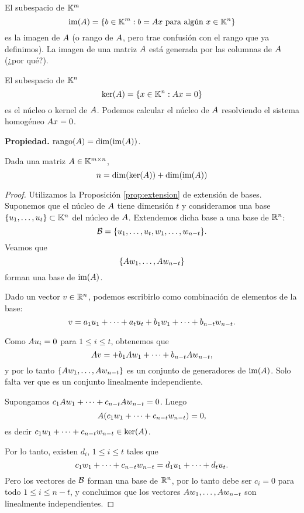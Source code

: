 \begin{definicion}
El subespacio de $\mathbb K^m$
$$
\im(A) =\{\bb \in \K^m : \bb = \Ab \xb \text{ para algún } \xb \in \K^n\}
$$
es la imagen de $\Ab$ (o rango de $\Ab$, pero trae confusión con el rango que ya definimos). La imagen de una matriz $\Ab$ está generada por las columnas de $\Ab$ (¿por qué?).

El subespacio de $\mathbb K^n$
$$
\ker(\Ab)=\{\xb \in \K^n: \Ab\xb = \cero\}
$$
es el núcleo o kernel de $\Ab$. Podemos calcular el núcleo de $\Ab$ resolviendo el sistema homogéneo $\Ab\xb = \cero$.
\end{definicion}



\textbf{Propiedad.} $\rank(\Ab) = \dim(\im(\Ab))$.

\begin{teorema} Dada una matriz $\Ab \in \K^{m \times n}$,
$$
n = \dim(\ker(\Ab)) + \dim(\im(\Ab))
$$
\end{teorema}

\begin{proof}
Utilizamos la Proposición \ref{prop:extension} de extensión de bases. Suponemos que el núcleo de $\Ab$ tiene dimensión $t$ y consideramos una base $\{\ub_1, \dots, \ub_t\} \subset \K^n$ del núcleo de $\Ab$. Extendemos dicha base a una base de $\mathbb R^n$:
$$
\B = \{\ub_1, \dots, \ub_t, \wb_1, \dots, \wb_{n-t}\}.
$$
Veamos que
$$
\{\Ab \wb_1, \dots, \Ab \wb_{n-t}\}
$$
forman una base de $\operatorname{im}(A)$.

Dado un vector $v \in \mathbb R^n$, podemos escribirlo como combinación de elementos de la base:
$$
v = a_1 \ub_1 + \dots +a_t \ub_t  + b_1 \wb_1 + \dots + b_{n-t} \wb_{n-t}.
$$

Como $\Ab \ub_i = \cero$ para $1 \le i \le t$, obtenemos que
$$
\Ab\vb = + b_1 \Ab \wb_1 + \dots + b_{n-t} \Ab\wb_{n-t},
$$
y por lo tanto $\{\Ab \wb_1, \dots, \Ab \wb_{n-t}\}$ es un conjunto de generadores de $\operatorname{im}(A)$. Solo falta ver que es un conjunto linealmente independiente.

Supongamos $c_1 \Ab \wb_1 + \dots + c_{n-t} \Ab \wb_{n-t} = 0$. Luego
$$
\Ab (c_1 \wb_1 + \dots + c_{n-t} \wb_{n-t}) = 0,
$$
es decir $c_1 \wb_1 + \dots + c_{n-t} \wb_{n-t} \in \ker(A)$.

Por lo tanto, existen $d_i$, $1 \le i \le t$ tales que
$$
c_1 \wb_1 + \dots + c_{n-t} \wb_{n-t} = d_1 \ub_1  + \dots + d_t \ub_t.
$$
Pero los vectores de $\mathcal B$ forman una base de $\mathbb R^n$, por lo tanto debe ser $c_i=0$ para todo $1 \le i \le n-t$, y concluimos que los vectores $\Ab \wb_1, \dots, \Ab \wb_{n-t}$ son linealmente independientes.
\end{proof}


